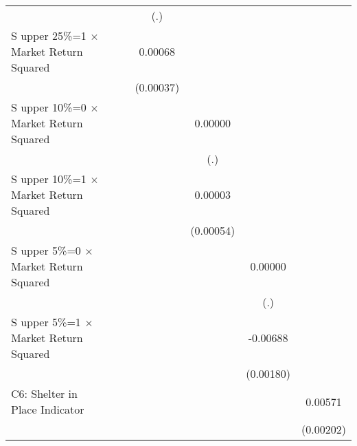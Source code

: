 \begin{table}[htbp]
\begin{tabular}{l*{6}{c}}
                    &                     &                     &         (.)         &                     &                     &                     \\
\addlinespace
S upper 25\%=1 $\times$ Market Return Squared&                     &                     &     0.00068\sym{*}  &                     &                     &                     \\
                    &                     &                     &   (0.00037)         &                     &                     &                     \\
\addlinespace
S upper 10\%=0 $\times$ Market Return Squared&                     &                     &                     &     0.00000         &                     &                     \\
                    &                     &                     &                     &         (.)         &                     &                     \\
\addlinespace
S upper 10\%=1 $\times$ Market Return Squared&                     &                     &                     &     0.00003         &                     &                     \\
                    &                     &                     &                     &   (0.00054)         &                     &                     \\
\addlinespace
S upper 5\%=0 $\times$ Market Return Squared&                     &                     &                     &                     &     0.00000         &                     \\
                    &                     &                     &                     &                     &         (.)         &                     \\
\addlinespace
S upper 5\%=1 $\times$ Market Return Squared&                     &                     &                     &                     &    -0.00688\sym{***}&                     \\
                    &                     &                     &                     &                     &   (0.00180)         &                     \\
\addlinespace
C6: Shelter in Place Indicator&                     &                     &                     &                     &                     &     0.00571\sym{***}\\
                    &                     &                     &                     &                     &                     &   (0.00202)         \\

\end{tabular}
\end{table}
